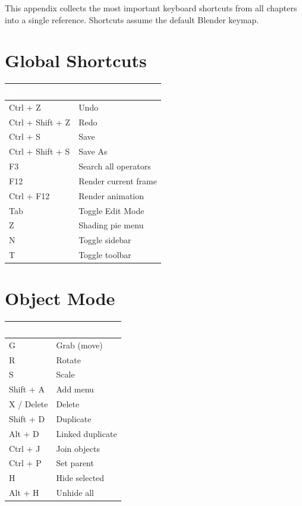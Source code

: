 \documentclass[11pt,letterpaper,twoside,openright]{book}
\newcommand{\tableheader}[1]{\textbf{\sffamily\textcolor{white}{#1}}}
\begin{document}
This appendix collects the most important keyboard shortcuts from all chapters into a single reference. Shortcuts assume the default Blender keymap.

\section{Global Shortcuts}

\begin{shortcutbox}
\begin{center}
\begin{tabularx}{\textwidth}{L{3.5cm}X}
\toprule
{}
\tableheader{Shortcut} & \tableheader{Action} \\
\midrule
Ctrl + Z & Undo \\
Ctrl + Shift + Z & Redo \\
Ctrl + S & Save \\
Ctrl + Shift + S & Save As \\
F3 & Search all operators \\
F12 & Render current frame \\
Ctrl + F12 & Render animation \\
Tab & Toggle Edit Mode \\
Z & Shading pie menu \\
N & Toggle sidebar \\
T & Toggle toolbar \\
\bottomrule
\end{tabularx}
\end{center}
\end{shortcutbox}

\section{Object Mode}

\begin{shortcutbox}
\begin{center}
\begin{tabularx}{\textwidth}{L{3.5cm}X}
\toprule
{}
\tableheader{Shortcut} & \tableheader{Action} \\
\midrule
G & Grab (move) \\
R & Rotate \\
S & Scale \\
Shift + A & Add menu \\
X / Delete & Delete \\
Shift + D & Duplicate \\
Alt + D & Linked duplicate \\
Ctrl + J & Join objects \\
Ctrl + P & Set parent \\
H & Hide selected \\
Alt + H & Unhide all \\
\bottomrule
\end{tabularx}
\end{center}
\end{shortcutbox}
\end{document}
